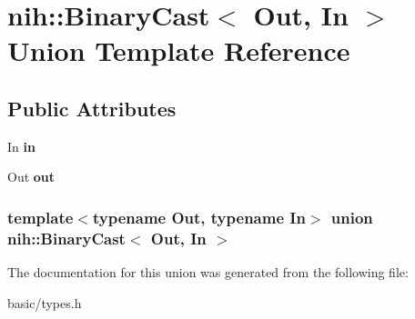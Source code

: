 \hypertarget{unionnih_1_1_binary_cast}{
\section{nih\-:\-:\-Binary\-Cast$<$ \-Out, \-In $>$ \-Union \-Template \-Reference}
\label{unionnih_1_1_binary_cast}
}
\subsection*{\-Public \-Attributes}
\begin{DoxyCompactItemize}
\item 
\hypertarget{unionnih_1_1_binary_cast_a23b9610bf7b602a5ae6d0230054198c4}{
\-In {\bfseries in}}
\label{unionnih_1_1_binary_cast_a23b9610bf7b602a5ae6d0230054198c4}

\item 
\hypertarget{unionnih_1_1_binary_cast_a95dcf1c1b1c7a37539dd71e980c34a02}{
\-Out {\bfseries out}}
\label{unionnih_1_1_binary_cast_a95dcf1c1b1c7a37539dd71e980c34a02}

\end{DoxyCompactItemize}
\subsubsection*{template$<$typename \-Out, typename \-In$>$ union nih\-::\-Binary\-Cast$<$ Out, In $>$}



\-The documentation for this union was generated from the following file\-:\begin{DoxyCompactItemize}
\item 
basic/types.\-h\end{DoxyCompactItemize}
